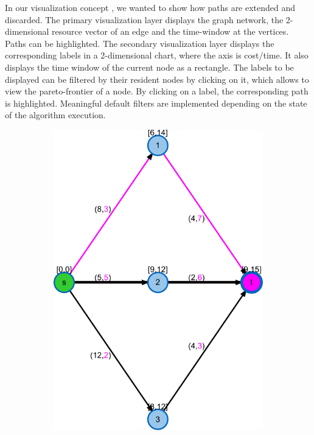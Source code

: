 
In our visualization concept , we wanted to show how paths are extended and discarded. The primary visualization layer displays the graph network, the 2-dimensional resource vector of an edge and the time-window at the vertices. Paths can be highlighted. The secondary visualization layer displays the corresponding labels in a 2-dimensional chart, where the axis is cost/time. It also displays the time window of the current node as a rectangle. The labels to be displayed can be filtered by their resident nodes by clicking on it, which allows to view the pareto-frontier of a node. By clicking on a label, the corresponding path is highlighted. Meaningful default filters are implemented depending on the state of the algorithm execution.
\begin{figure}
\centering
\begin{subfigure}[t]{0.45\textwidth}
\includegraphics[width=\textwidth]{fig/spp-rc-graph-algorithm-graph}

\end{subfigure}
\end{figure}
